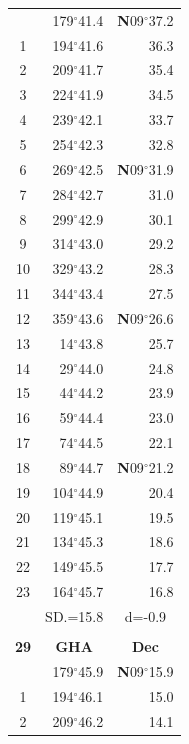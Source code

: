 \documentclass[10pt, a4paper]{report}
\begin{document}
\begin{scriptsize}
\begin{tabular*}{0.2\textwidth}[t]{@{\extracolsep{\fill}}|c|rr|}
\hline\rule{0pt}{2.6ex}\noindent
0 & 179$^\circ$41.4 & \textbf{N}09$^\circ$37.2\\
1 & 194$^\circ$41.6 & 36.3\\
2 & 209$^\circ$41.7 & 35.4\\
3 & 224$^\circ$41.9 & \raisebox{0.24ex}{\boldmath$\cdot$~\boldmath$\cdot$~~}34.5\\
4 & 239$^\circ$42.1 & 33.7\\
5 & 254$^\circ$42.3 & 32.8\\[2Pt]
6 & 269$^\circ$42.5 & \textbf{N}09$^\circ$31.9\\
7 & 284$^\circ$42.7 & 31.0\\
8 & 299$^\circ$42.9 & 30.1\\
9 & 314$^\circ$43.0 & \raisebox{0.24ex}{\boldmath$\cdot$~\boldmath$\cdot$~~}29.2\\
10 & 329$^\circ$43.2 & 28.3\\
11 & 344$^\circ$43.4 & 27.5\\[2Pt]
12 & 359$^\circ$43.6 & \textbf{N}09$^\circ$26.6\\
13 & 14$^\circ$43.8 & 25.7\\
14 & 29$^\circ$44.0 & 24.8\\
15 & 44$^\circ$44.2 & \raisebox{0.24ex}{\boldmath$\cdot$~\boldmath$\cdot$~~}23.9\\
16 & 59$^\circ$44.4 & 23.0\\
17 & 74$^\circ$44.5 & 22.1\\[2Pt]
18 & 89$^\circ$44.7 & \textbf{N}09$^\circ$21.2\\
19 & 104$^\circ$44.9 & 20.4\\
20 & 119$^\circ$45.1 & 19.5\\
21 & 134$^\circ$45.3 & \raisebox{0.24ex}{\boldmath$\cdot$~\boldmath$\cdot$~~}18.6\\
22 & 149$^\circ$45.5 & 17.7\\
23 & 164$^\circ$45.7 & 16.8\\
\hline
\rule{0pt}{2.4ex} & \multicolumn{1}{c}{SD.=15.8} & \multicolumn{1}{c|}{d=-0.9}\\
\hline
\multicolumn{1}{c}{}\\[-0.5ex]\hline
\multicolumn{1}{|c|}{\rule{0pt}{2.6ex}\textbf{29}} & \multicolumn{1}{c}{\textbf{GHA}} & \multicolumn{1}{c|}{\textbf{Dec}}\\
\hline\rule{0pt}{2.6ex}\noindent
0 & 179$^\circ$45.9 & \textbf{N}09$^\circ$15.9\\
1 & 194$^\circ$46.1 & 15.0\\
2 & 209$^\circ$46.2 & 14.1\\

\end{tabular*}
\end{scriptsize}
\end{document}
